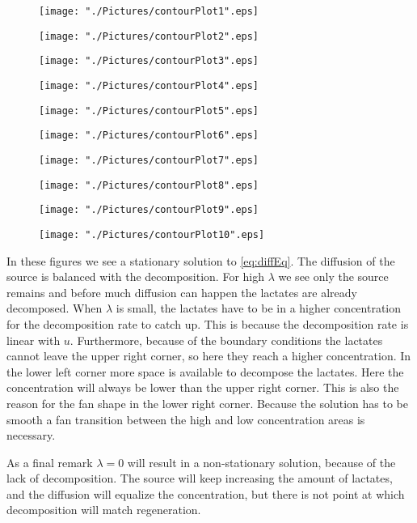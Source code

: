 \documentclass[10pt,a4paper]{article}
\begin{document}
\begin{figure}[H]
	\centering
	\texttt{[image: "./Pictures/contourPlot1".eps]}
\end{figure}
\begin{figure}[H]
	\centering
	\texttt{[image: "./Pictures/contourPlot2".eps]}
\end{figure}
\begin{figure}[H]
	\centering
	\texttt{[image: "./Pictures/contourPlot3".eps]}
\end{figure}
\begin{figure}[H]
	\centering
	\texttt{[image: "./Pictures/contourPlot4".eps]}
\end{figure}
\begin{figure}[H]
	\centering
	\texttt{[image: "./Pictures/contourPlot5".eps]}
\end{figure}
\begin{figure}[H]
	\centering
	\texttt{[image: "./Pictures/contourPlot6".eps]}
\end{figure}
\begin{figure}[H]
	\centering
	\texttt{[image: "./Pictures/contourPlot7".eps]}
\end{figure}
\begin{figure}[H]
	\centering
	\texttt{[image: "./Pictures/contourPlot8".eps]}
\end{figure}
\begin{figure}[H]
	\centering
	\texttt{[image: "./Pictures/contourPlot9".eps]}
\end{figure}
\begin{figure}[H]
	\centering
	\texttt{[image: "./Pictures/contourPlot10".eps]}
\end{figure}

In these figures we see a stationary solution to \cref{eq:diffEq}. 
The diffusion of the source is balanced with the decomposition. 
For high $\lambda$ we see only the source remains and before much diffusion can happen the lactates are already decomposed. 
When $\lambda$ is small, the lactates have to be in a higher concentration for the decomposition rate to catch up. 
This is because the decomposition rate is linear with $u$. 
Furthermore, because of the boundary conditions the lactates cannot leave the upper right corner, so here they reach a higher concentration. 
In the lower left corner more space is available to decompose the lactates. 
Here the concentration will always be lower than the upper right corner.
This is also the reason for the fan shape in the lower right corner.
Because the solution has to be smooth a fan transition between the high and low concentration areas is necessary.

As a final remark $\lambda=0$ will result in a non-stationary solution, because of the lack of decomposition. The source will keep increasing the amount of lactates, and the diffusion will equalize the concentration, but there is not point at which decomposition will match regeneration. 
\end{document}
